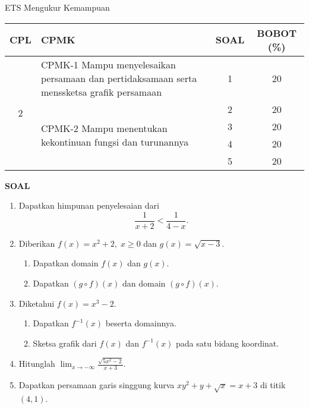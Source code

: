 \documentclass[11pt,openany,a4paper]{article}
\begin{document}
\begin{table}[h]
    \centering
    ETS Mengukur Kemampuan
    \begin{tabular}{|c|m{11cm}|c|c|}
        \hline
        CPL & CPMK                                                                                      & SOAL & BOBOT (\%) \\ \hline
        \multirow{5}{*}{2}
            & CPMK-1 Mampu menyelesaikan persamaan dan pertidaksamaan serta menssketsa grafik persamaan & 1    & 20         \\ \cline{2-4}
            & \multirow{4}{*}{CPMK-2 Mampu menentukan kekontinuan fungsi dan turunannya}                & 2    & 20         \\\cline{3-4}
            &                                                                                           & 3    & 20         \\ \cline{3-4}
            &                                                                                           & 4    & 20         \\ \cline{3-4}
            &                                                                                           & 5    & 20         \\ \hline
    \end{tabular}
\end{table}
{\centering\textbf{SOAL}}
\begin{enumerate}
    \item Dapatkan himpunan penyelesaian dari
          \[
              \frac{1}{x+2} < \frac{1}{4-x}.
          \]

    \item Diberikan $f(x) = x^2 + 2,\; x \geq 0$ dan $g(x) = \sqrt{x-3}$.
          \begin{enumerate}
              \item Dapatkan domain $f(x)$ dan $g(x)$.
              \item Dapatkan $(g \circ f)(x)$ dan domain $(g \circ f)(x)$.
          \end{enumerate}

    \item Diketahui $f(x) = x^3 - 2$.
          \begin{enumerate}
              \item Dapatkan $f^{-1}(x)$ beserta domainnya.
              \item Sketsa grafik dari $f(x)$ dan $f^{-1}(x)$ pada satu bidang koordinat.
          \end{enumerate}

    \item Hitunglah $\displaystyle\lim_{x \to -\infty} \frac{\sqrt{5x^2 - 2}}{x+3}$.

    \item Dapatkan persamaan garis singgung kurva $xy^2 + y + \sqrt{x} = x + 3$ di titik $(4,1)$.
\end{enumerate}
\end{document}

